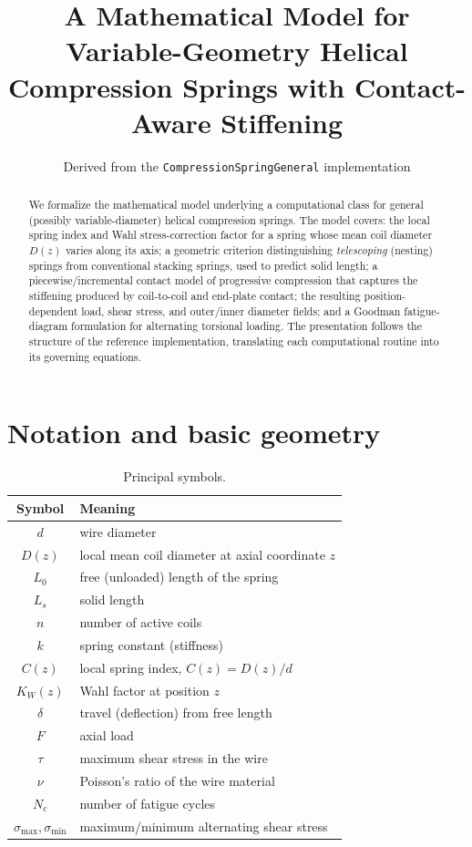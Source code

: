 \documentclass[11pt]{article}
\title{A Mathematical Model for Variable-Geometry Helical\\
Compression Springs with Contact-Aware Stiffening}
\author{Derived from the \texttt{CompressionSpringGeneral} implementation}
\date{}
\begin{document}
\maketitle

\begin{abstract}
We formalize the mathematical model underlying a computational class for
general (possibly variable-diameter) helical compression springs. The model
covers: the local spring index and Wahl stress-correction factor for a
spring whose mean coil diameter $D(z)$ varies along its axis; a geometric
criterion distinguishing \emph{telescoping} (nesting) springs from
conventional stacking springs, used to predict solid length; a
piecewise/incremental contact model of progressive compression that
captures the stiffening produced by coil-to-coil and end-plate contact;
the resulting position-dependent load, shear stress, and outer/inner
diameter fields; and a Goodman fatigue-diagram formulation for
alternating torsional loading. The presentation follows the structure of
the reference implementation, translating each computational routine into
its governing equations.
\end{abstract}

\tableofcontents

\section{Notation and basic geometry}

\begin{table}[h!]
\centering
\begin{tabular}{cl}
\toprule
Symbol & Meaning \\
\midrule
$d$ & wire diameter \\
$D(z)$ & local mean coil diameter at axial coordinate $z$ \\
$L_0$ & free (unloaded) length of the spring \\
$L_s$ & solid length \\
$n$ & number of active coils \\
$k$ & spring constant (stiffness) \\
$C(z)$ & local spring index, $C(z) = D(z)/d$ \\
$K_W(z)$ & Wahl factor at position $z$ \\
$\delta$ & travel (deflection) from free length \\
$F$ & axial load \\
$\tau$ & maximum shear stress in the wire \\
$\nu$ & Poisson's ratio of the wire material \\
$N_c$ & number of fatigue cycles \\
$\sigma_{\max},\sigma_{\min}$ & maximum/minimum alternating shear stress \\
\bottomrule
\end{tabular}
\caption{Principal symbols.}
\end{table}
\end{document}
